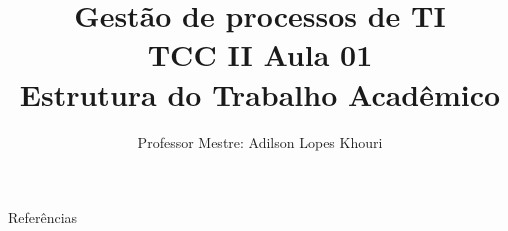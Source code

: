 \documentclass[compress, hyperref={pdfpagelayout=SinglePage}]{beamer}
\title[TCC II - Aula 01]{Gestão de processos de TI \\ TCC II Aula 01 \\ Estrutura do Trabalho Acadêmico}
\author{Professor Mestre: Adilson Lopes Khouri}
\begin{document}
	\begin{frame}
		\titlepage
	\end{frame}
	
	
	
	
	
	
	
	
	
	
		
	

	
	
	
	
		
	
		
		
		
				
	

	
	
	\begin{frame}[allowframebreaks]{}
		\begin{block}{Referências}
			\tiny
			\nocite{*}
			
	    		
	    	\end{block}
	\end{frame}
\end{document}

